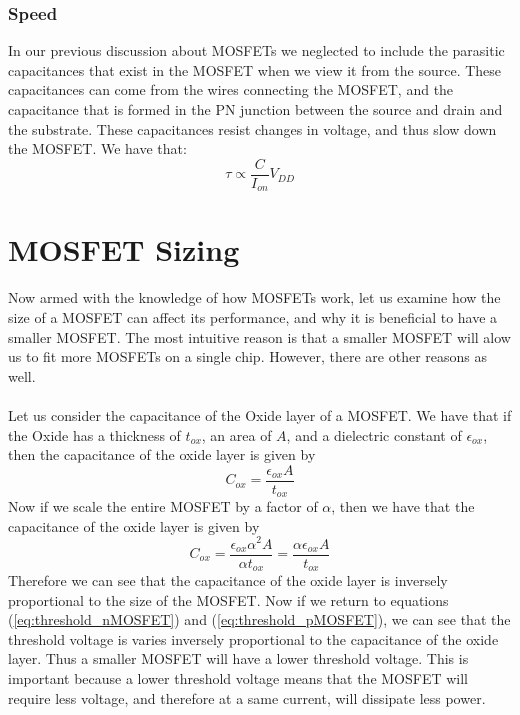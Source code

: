 \documentclass[
  reprint,
  amsmath,amssymb,
  aps
]{revtex4-1}
\begin{document}
\subsubsection*{Speed}
In our previous discussion about MOSFETs we neglected to include the parasitic capacitances that exist in the MOSFET when we 
view it from the source. These capacitances can come from the wires connecting the MOSFET, and the capacitance that is formed in the 
PN junction between the source and drain and the substrate. These capacitances resist changes in voltage, and thus slow down the 
MOSFET. We have that:
\begin{equation}
  \tau \propto \frac{C}{I_{on}}V_{DD}
\end{equation}
\section*{MOSFET Sizing}
Now armed with the knowledge of how MOSFETs work, let us examine how the size of a MOSFET can affect its performance, and why 
it is beneficial to have a smaller MOSFET. The most intuitive reason is that a smaller MOSFET will alow us to fit more MOSFETs
on a single chip. However, there are other reasons as well.\\\\
Let us consider the capacitance of the Oxide layer of a MOSFET. We have that if the Oxide has a thickness of $t_{ox}$, 
an area of $A$, and a dielectric constant of $\epsilon_{ox}$, then the capacitance of the oxide layer is given by
\begin{equation}
  C_{ox} = \frac{\epsilon_{ox}A}{t_{ox}}
\end{equation}
Now if we scale the entire MOSFET by a factor of $\alpha$, then we have that the capacitance of the oxide layer is given by
\begin{equation}
  C_{ox} = \frac{\epsilon_{ox}\alpha^{2}A}{\alpha t_{ox}} = \frac{\alpha \epsilon_{ox}A}{t_{ox}}
\end{equation}
Therefore we can see that the capacitance of the oxide layer is inversely proportional to the size of the MOSFET. Now if we return to 
equations (\ref{eq:threshold_nMOSFET}) and (\ref{eq:threshold_pMOSFET}), we can see that the threshold voltage is varies inversely proportional to the capacitance of the oxide layer. 
Thus a smaller MOSFET will have a lower threshold voltage. This is important because a lower threshold voltage means that the MOSFET will require less voltage, and therefore 
at a same current, will dissipate less power.\\\\
\end{document}
